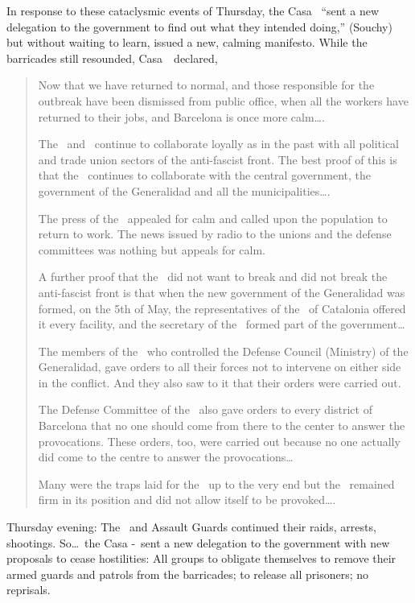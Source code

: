 In response to these cataclysmic events of Thursday, the Casa \CNT\ ``sent a new delegation to the government to find out what they intended doing,'' (Souchy) but without waiting to learn, issued a new, calming manifesto. While the barricades still resounded, Casa~\CNT~declared,

\begin{quotation}
  Now that we have returned to normal, and those responsible for the outbreak have been dismissed from public office, when all the workers have returned to their jobs, and Barcelona is once more calm\dots.
  
  The \CNT\ and \FAI\ continue to collaborate loyally as in the past with all political and trade union sectors of the anti-fascist front. The best proof of this is that the \CNT\ continues to collaborate with the central government, the government of the Generalidad and all the municipalities\dots.
  
  The press of the \CNT\ appealed for calm and called upon the population to return to work. The news issued by radio to the unions and the defense committees was nothing but appeals for calm.
  
  A further proof that the \CNT\ did not want to break and did not break the anti-fascist front is that when the new government of the Generalidad was formed, on the 5th of May, the representatives of the \CNT\ of Catalonia offered it every facility, and the secretary of the \CNT\ formed part of the government\dots
  
  The members of the \CNT\ who controlled the Defense Council (Ministry) of the Generalidad, gave orders to all their forces not to intervene on either side in the conflict. And they also saw to it that their orders were carried out.
  
  The Defense Committee of the \CNT\ also gave orders to every district of Barcelona that no one should come from there to the center to answer the provocations. These orders, too, were carried out because no one actually did come to the centre to answer the provocations\dots
  
  Many were the traps laid for the \CNT\ up to the very end but the \CNT\ remained firm in its position and did not allow itself to be provoked\dots.
\end{quotation}

Thursday evening: The \PSUC\ and Assault Guards continued their raids, arrests, shootings. So\dots\ the Casa \CNT-\FAI\ sent a new delegation to the government with new proposals to cease hostilities: All groups to obligate themselves to remove their armed guards and patrols from the barricades; to release all prisoners; no reprisals.

